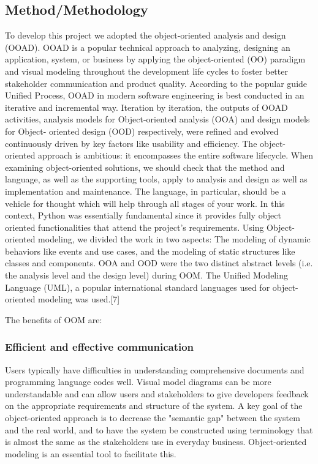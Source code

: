 \documentclass{acm_proc_article-sp}
\begin{document}
\subsection{Method/Methodology}
To develop this project we adopted the object-oriented analysis and design (OOAD). OOAD is a popular technical approach to analyzing, designing an application, system, or business by applying the object-oriented (OO) paradigm and visual modeling throughout the development life cycles to foster better stakeholder communication and product quality.
\newline
\newline
According to the popular guide Unified Process, OOAD in modern software engineering is best conducted in an iterative and incremental way. Iteration by iteration, the outputs of OOAD activities, analysis models for Object-oriented analysis (OOA) and design models for Object- oriented design (OOD) respectively, were refined and evolved continuously driven by key factors like usability and efficiency.
\newline
\newline
The object-oriented approach is ambitious: it encompasses the entire software lifecycle. When examining object-oriented solutions, we should check that the method and language, as well as the supporting tools, apply to analysis and design as well as implementation and maintenance. The language, in particular, should be a vehicle for thought which will help through all stages of your work. In this context, Python was essentially fundamental since it provides fully object oriented functionalities that attend the project's requirements. 
\newline
\newline
Using Object-oriented modeling, we divided the work in two aspects: The modeling of dynamic behaviors like events and use cases, and the modeling of static structures like classes and components. OOA and OOD were the two distinct abstract levels (i.e. the analysis level and the design level) during OOM. The Unified Modeling Language (UML), a popular international standard languages used for object-oriented modeling was used.[7]

The benefits of OOM are:

\subsubsection{Efficient and effective communication}

Users typically have difficulties in understanding comprehensive documents and programming language codes well. Visual model diagrams can be more understandable and can allow users and stakeholders to give developers feedback on the appropriate requirements and structure of the system. A key goal of the object-oriented approach is to decrease the "semantic gap" between the system and the real world, and to have the system be constructed using terminology that is almost the same as the stakeholders use in everyday business. Object-oriented modeling is an essential tool to facilitate this.
\end{document}
